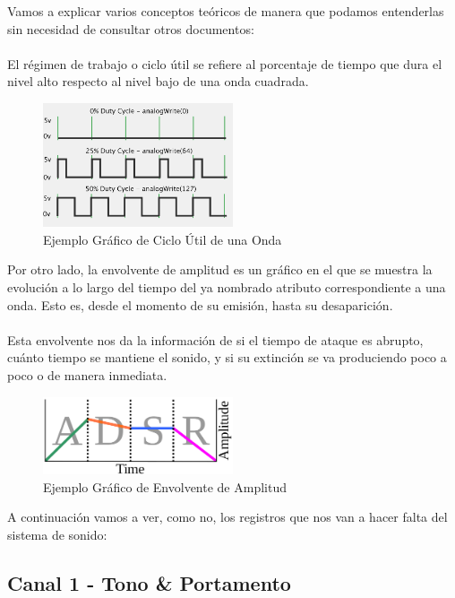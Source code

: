 Vamos a explicar varios conceptos teóricos de manera que podamos entenderlas sin necesidad de consultar otros documentos:
\\ \\
El régimen de trabajo o ciclo útil se refiere al porcentaje de tiempo que dura el nivel alto respecto al nivel bajo de una onda cuadrada.

\begin{figure}[h]
\centering
\includegraphics[width=0.5\textwidth]{include/images/manual/cycle.png}
\caption{Ejemplo Gráfico de Ciclo Útil de una Onda}
\label{figure:cycle}
\end{figure}

Por otro lado, la envolvente de amplitud es un gráfico en el que se muestra la evolución a lo largo del tiempo del ya nombrado atributo correspondiente a una onda. Esto es, desde el momento de su emisión, hasta su desaparición.
\\ \\
Esta envolvente nos da la información de si el tiempo de ataque es abrupto, cuánto tiempo se mantiene el sonido, y si su extinción se va produciendo poco a poco o de manera inmediata.

\begin{figure}[h]
\centering
\includegraphics[width=0.5\textwidth]{include/images/manual/envelope.png}
\caption{Ejemplo Gráfico de Envolvente de Amplitud}
\label{figure:envelope}
\end{figure}

A continuación vamos a ver, como no, los registros que nos van a hacer falta del sistema de sonido:

\subsection{Canal 1 - Tono \& Portamento}
	
